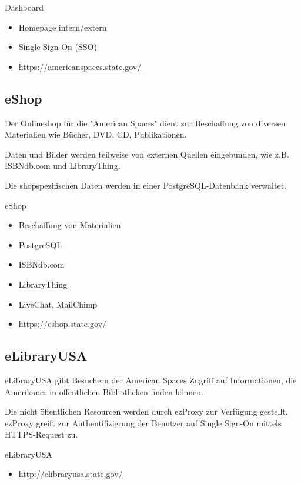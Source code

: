 \begin{frame}{Dashboard}
\begin{itemize}
\item Homepage intern/extern
\item Single Sign-On (SSO)
\item \url{https://americanspaces.state.gov/}
\end{itemize}
\end{frame}
    
\subsection{eShop}

Der Onlineshop für die "American Spaces" dient zur Beschaffung von
diversen Materialien wie Bücher, DVD, CD, Publikationen.

Daten und Bilder werden teilweise von externen Quellen eingebunden,
wie z.B. ISBNdb.com und LibraryThing.

Die shopspezifischen Daten werden in einer PostgreSQL-Datenbank
verwaltet.

\begin{frame}{eShop}
\begin{itemize}
\item Beschaffung von Materialien
\item PostgreSQL
\item ISBNdb.com
\item LibraryThing
\item LiveChat, MailChimp
\item \url{https://eshop.state.gov/}
\end{itemize}
\end{frame}
    
\subsection{eLibraryUSA}

eLibraryUSA gibt Besuchern der American Spaces Zugriff
auf Informationen, die Amerikaner in öffentlichen
Bibliotheken finden können.
    
Die nicht öffentlichen Resourcen werden durch ezProxy zur
Verfügung gestellt. ezProxy greift zur Authentifizierung
der Benutzer auf Single Sign-On mittels HTTPS-Request zu.

\begin{frame}{eLibraryUSA}
\begin{itemize}
\item \url{http://elibraryusa.state.gov/}
\end{itemize}
\end{frame}

